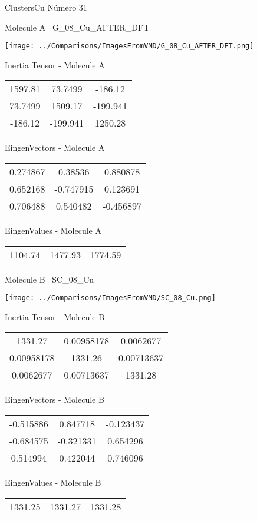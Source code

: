  \newpage

\vtab[-3cm]
\begin{center}
{\large ClustersCu \tab Número 31}
\end{center}
\begin{multicols}{2}
\begin{center}

Molecule A \
G\_08\_Cu\_AFTER\_DFT

\texttt{[image: ../Comparisons/ImagesFromVMD/G\_08\_Cu\_AFTER\_DFT.png]}

Inertia Tensor - Molecule A \\
\begin{tabular}{|c c c|}
1597.81	 & 	73.7499	 & 	-186.12	 \\
73.7499	 & 	1509.17	 & 	-199.941	 \\
-186.12	 & 	-199.941	 & 	1250.28
\end{tabular}

\vtab
 EingenVectors - Molecule A     \\
\begin{tabular}{|c c c|}
0.274867	 & 	0.38536	 & 	0.880878	 \\
0.652168	 & 	-0.747915	 & 	0.123691	 \\
0.706488	 & 	0.540482	 & 	-0.456897
\end{tabular}

\vtab
 EingenValues - Molecule A     \\
\begin{tabular}{|c c c|}
1104.74	 & 	1477.93	 & 	1774.59	 \\
\end{tabular}
\columnbreak

Molecule B \
SC\_08\_Cu

\texttt{[image: ../Comparisons/ImagesFromVMD/SC\_08\_Cu.png]}

Inertia Tensor - Molecule B \\
\begin{tabular}{|c c c|}
1331.27	 & 	0.00958178	 & 	0.0062677	 \\
0.00958178	 & 	1331.26	 & 	0.00713637	 \\
0.0062677	 & 	0.00713637	 & 	1331.28
\end{tabular}

\vtab
 EingenVectors - Molecule B     \\
\begin{tabular}{|c c c|}
-0.515886	 & 	0.847718	 & 	-0.123437	 \\
-0.684575	 & 	-0.321331	 & 	0.654296	 \\
0.514994	 & 	0.422044	 & 	0.746096
\end{tabular}

\vtab
 EingenValues - Molecule B     \\
\begin{tabular}{|c c c|}
1331.25	 & 	1331.27	 & 	1331.28	 \\
\end{tabular}

\end{center}
\end{multicols}

